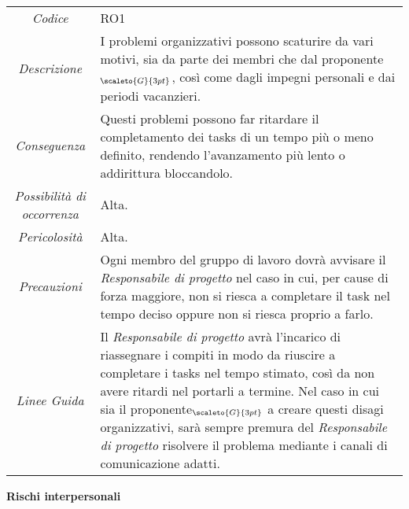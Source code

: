 {{	\begin{center}
		\renewcommand{\arraystretch}{1.4}
		\begin{tabularx}{\textwidth}{|c|X|}
			\hline
			\rowcolor{airforceblue}
			\multicolumn{2}{|c|}{\textit{Problemi organizzativi}}\\
			\hline
			\textit{Codice} & RO1 \\
			\hline
			\textit{Descrizione} & I problemi organizzativi possono scaturire da vari motivi, sia da parte dei membri che dal proponente$_{\scaleto{G}{3pt}}$, così come dagli impegni personali e dai periodi vacanzieri.  \\
			\hline
			\textit{Conseguenza} & Questi problemi possono far ritardare il completamento dei tasks di un tempo più o meno definito, rendendo l'avanzamento più lento o addirittura bloccandolo. \\
			\hline
			\textit{Possibilità di occorrenza} & Alta. \\
			\hline
			\textit{Pericolosità} & Alta. \\
			\hline
			\textit{Precauzioni} & Ogni membro del gruppo di lavoro dovrà avvisare il \textit{Responsabile di progetto} nel caso in cui, per cause di forza maggiore, non si riesca a completare il task nel tempo deciso oppure non si riesca proprio a farlo. \\
			\hline
			\textit{Linee Guida} & Il \textit{Responsabile di progetto} avrà l'incarico di riassegnare i compiti in modo da riuscire a completare i tasks nel tempo stimato, così da non avere ritardi nel portarli a termine.
			Nel caso in cui sia il proponente$_{\scaleto{G}{3pt}}$ a creare questi disagi organizzativi, sarà sempre premura del \textit{Responsabile di progetto} risolvere il problema mediante i canali di comunicazione adatti.  \\
			\hline
		\end{tabularx}
	\end{center}

\quad
\begin{center}
	\LARGE\textbf{Rischi interpersonali}
\end{center}

\def\tabularxcolumn#1{m{#1}}
{
	
	\begin{center}
		\renewcommand{\arraystretch}{1.4}
		 

\end{center}}}}
